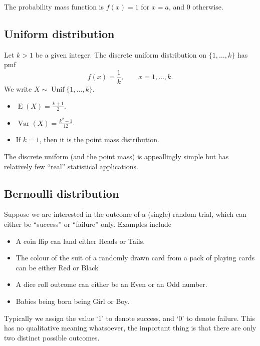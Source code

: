 \documentclass[
]{book}
\providecommand{\tightlist}{%
  \setlength{\itemsep}{0pt}\setlength{\parskip}{0pt}}
\DeclareMathOperator{\E}{E}
\DeclareMathOperator{\Var}{Var}
\DeclareMathOperator{\Unif}{Unif}
\theoremstyle{definition}
\theoremstyle{definition}
\theoremstyle{definition}
\theoremstyle{definition}
\theoremstyle{remark}
\begin{document}
The probability mass function is \(f(x)=1\) for \(x=a\), and 0 otherwise.

\hypertarget{uniform-distribution}{%
\subsection{Uniform distribution}\label{uniform-distribution}}

Let \(k>1\) be a given integer. The discrete uniform distribution on \(\{1,\dots,k\}\) has pmf
\[
f(x) = \frac{1}{k}, \hspace{2em} x=1,\dots,k.
\]
We write \(X\sim\Unif\{1,\dots,k\}\).

\begin{itemize}
\tightlist
\item
  \(\E(X)=\frac{k+1}{2}\).
\item
  \(\Var(X)=\frac{k^2-1}{12}\).
\item
  If \(k=1\), then it is the point mass distribution.
\end{itemize}

The discrete uniform (and the point mass) is appeallingly simple but has relatively few ``real'' statistical applications.

\hypertarget{bernoulli-distribution}{%
\subsection{Bernoulli distribution}\label{bernoulli-distribution}}

Suppose we are interested in the outcome of a (single) random trial, which can either be {``success''} or {``failure''} only. Examples include

\begin{itemize}
\tightlist
\item
  A coin flip can land either {Heads} or {Tails}.
\item
  The colour of the suit of a randomly drawn card from a pack of playing cards can be either {Red} or {Black}
\item
  A dice roll outcome can either be an {Even} or an {Odd} number.
\item
  Babies being born being {Girl} or {Boy}.
\end{itemize}

Typically we assign the value `1' to denote success, and `0' to denote failure.
This has no qualitative meaning whatsoever, the important thing is that there are only two distinct possible outcomes.
\end{document}

